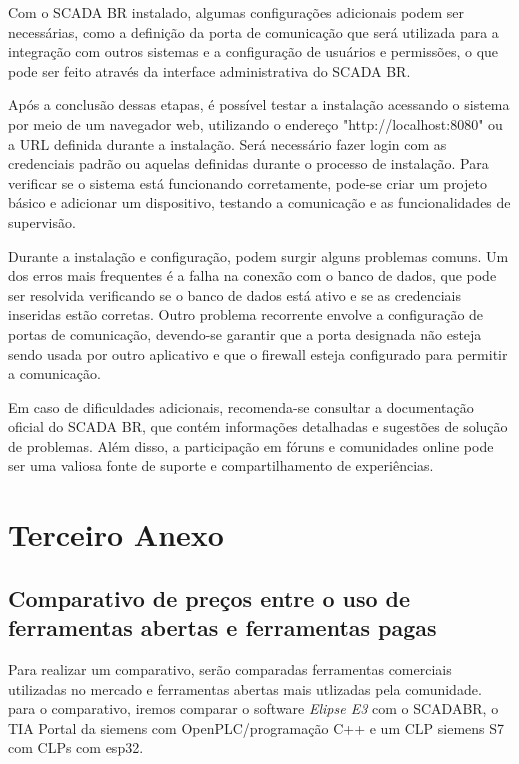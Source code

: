 \begin{anexosenv}
Com o SCADA BR instalado, algumas configurações adicionais podem ser necessárias, como a definição da porta de comunicação que será utilizada para a integração com outros sistemas e a configuração de usuários e permissões, o que pode ser feito através da interface administrativa do SCADA BR.

Após a conclusão dessas etapas, é possível testar a instalação acessando o sistema por meio de um navegador web, utilizando o endereço "http://localhost:8080" ou a URL definida durante a instalação. Será necessário fazer login com as credenciais padrão ou aquelas definidas durante o processo de instalação. Para verificar se o sistema está funcionando corretamente, pode-se criar um projeto básico e adicionar um dispositivo, testando a comunicação e as funcionalidades de supervisão.

Durante a instalação e configuração, podem surgir alguns problemas comuns. Um dos erros mais frequentes é a falha na conexão com o banco de dados, que pode ser resolvida verificando se o banco de dados está ativo e se as credenciais inseridas estão corretas. Outro problema recorrente envolve a configuração de portas de comunicação, devendo-se garantir que a porta designada não esteja sendo usada por outro aplicativo e que o firewall esteja configurado para permitir a comunicação.

Em caso de dificuldades adicionais, recomenda-se consultar a documentação oficial do SCADA BR, que contém informações detalhadas e sugestões de solução de problemas. Além disso, a participação em fóruns e comunidades online pode ser uma valiosa fonte de suporte e compartilhamento de experiências.


\chapter{Terceiro Anexo}

\section{Comparativo de preços entre o uso de ferramentas abertas e ferramentas pagas}

Para realizar um comparativo, serão comparadas ferramentas comerciais utilizadas no mercado e ferramentas abertas mais utlizadas pela comunidade. para o comparativo, iremos comparar o software \textit{Elipse E3} com o SCADABR, o TIA Portal da siemens com OpenPLC/programação C++ e um CLP siemens S7 com CLPs com esp32.


\end{anexosenv}
